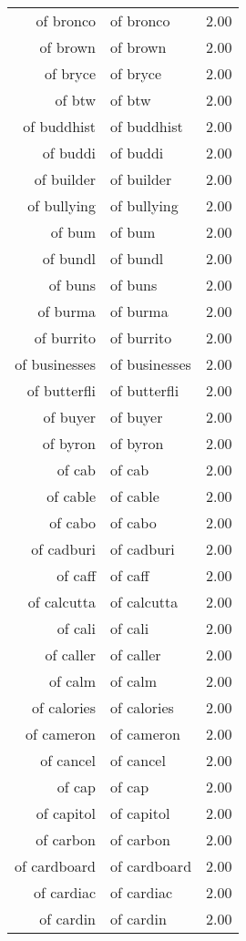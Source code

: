 \begin{table}[ht]
\begin{tabular}{rlr}
  of bronco & of bronco & 2.00 \\ 
  of brown & of brown & 2.00 \\ 
  of bryce & of bryce & 2.00 \\ 
  of btw & of btw & 2.00 \\ 
  of buddhist & of buddhist & 2.00 \\ 
  of buddi & of buddi & 2.00 \\ 
  of builder & of builder & 2.00 \\ 
  of bullying & of bullying & 2.00 \\ 
  of bum & of bum & 2.00 \\ 
  of bundl & of bundl & 2.00 \\ 
  of buns & of buns & 2.00 \\ 
  of burma & of burma & 2.00 \\ 
  of burrito & of burrito & 2.00 \\ 
  of businesses & of businesses & 2.00 \\ 
  of butterfli & of butterfli & 2.00 \\ 
  of buyer & of buyer & 2.00 \\ 
  of byron & of byron & 2.00 \\ 
  of cab & of cab & 2.00 \\ 
  of cable & of cable & 2.00 \\ 
  of cabo & of cabo & 2.00 \\ 
  of cadburi & of cadburi & 2.00 \\ 
  of caff & of caff & 2.00 \\ 
  of calcutta & of calcutta & 2.00 \\ 
  of cali & of cali & 2.00 \\ 
  of caller & of caller & 2.00 \\ 
  of calm & of calm & 2.00 \\ 
  of calories & of calories & 2.00 \\ 
  of cameron & of cameron & 2.00 \\ 
  of cancel & of cancel & 2.00 \\ 
  of cap & of cap & 2.00 \\ 
  of capitol & of capitol & 2.00 \\ 
  of carbon & of carbon & 2.00 \\ 
  of cardboard & of cardboard & 2.00 \\ 
  of cardiac & of cardiac & 2.00 \\ 
  of cardin & of cardin & 2.00 \\ 

\end{tabular}
\end{table}
